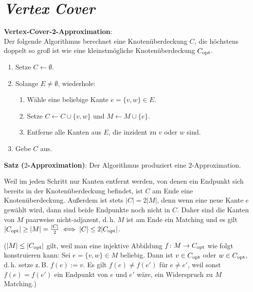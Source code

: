 \pagebreak

\section{%
    \emph{Vertex Cover}%
}

\textbf{Vertex-Cover-2-Approximation}:\\
Der folgende Algorithmus berechnet eine
Knotenüberdeckung $C$, die höchstens doppelt so
groß ist wie eine kleinstmögliche Knotenüberdeckung $C_{\text{opt}}$.
\begin{enumerate}
    \item
    Setze $C \leftarrow \emptyset$.

    \item
    Solange $E \not= \emptyset$, wiederhole:
    \begin{enumerate}
        \item
        Wähle eine beliebige Kante $e = \{v, w\} \in E$.

        \item
        Setze $C \leftarrow C \cup \{v, w\}$ und $M \leftarrow M \cup \{e\}$.

        \item
        Entferne alle Kanten aus $E$, die inzident zu $v$ oder $w$ sind.
    \end{enumerate}

    \item
    Gebe $C$ aus.
\end{enumerate}

\linie

\textbf{Satz ($2$-Approximation)}:
Der Algorithmus produziert eine $2$-Approximation.

\begin{Beweis}
    Weil im jeden Schritt nur Kanten entfernt werden, von denen ein Endpunkt sich bereits in der
    Knotenüberdeckung befindet, ist $C$ am Ende eine Knotenüberdeckung.
    Außerdem ist stets $|C| = 2|M|$, denn wenn eine neue Kante $e$ gewählt wird, dann sind beide
    Endpunkte noch nicht in $C$.
    Daher sind die Kanten von $M$ paarweise nicht-adjazent,
    d.\,h. $M$ ist am Ende ein Matching und es gilt
    $|C_{\text{opt}}| \ge |M| = \frac{|C|}{2} \iff |C| \le 2|C_{\text{opt}}|$.

    ($|M| \le |C_{\text{opt}}|$ gilt, weil man eine injektive Abbildung
    $f\colon M \to C_{\text{opt}}$ wie folgt konstruieren kann:
    Sei $e = \{v, w\} \in M$ beliebig.
    Dann ist $v \in C_{\text{opt}}$ oder $w \in C_{\text{opt}}$, d.\,h. setze z.\,B. $f(e) := v$.
    Es gilt $f(e) \not= f(e')$ für $e \not= e'$,
    weil sonst $f(e) = f(e')$ ein Endpunkt von $e$ und $e'$ wäre,
    ein Widerspruch zu $M$ Matching.)
\end{Beweis}

